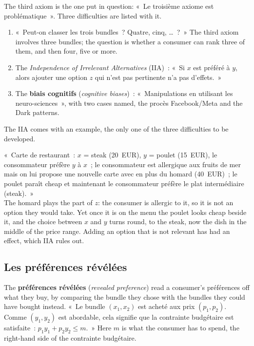 The third axiom is the one put in question: «~Le troisième axiome est
problématique~». Three difficulties are listed with it.

\begin{enumerate}
  \item «~Peut-on classer les trois bundles~? Quatre, cinq, \ldots~?~» The third
    axiom involves three bundles; the question is whether a consumer can rank
    three of them, and then four, five or more.
  \item The \emph{Independence of Irrelevant Alternatives} (IIA)~: «~Si $x$ est
    préféré à $y$, alors ajouter une option $z$ qui n'est pas pertinente n'a pas
    d'effets.~»
  \item The \textbf{biais cognitifs} (\textit{cognitive biases})~:
    «~Manipulations en utilisant les neuro-sciences~», with two cases named, the
    procès Facebook/Meta and the Dark patterns.
\end{enumerate}

The IIA comes with an example, the only one of the three difficulties to be
developed.

\begin{example}
  «~Carte de restaurant~: $x$ = steak (20~EUR), $y$ = poulet (15~EUR), le
  consommateur préfère $y$ à $x$~; le consommateur est allergique aux fruits de mer
  mais on lui propose une nouvelle carte avec en plus du homard (40~EUR)~; le
  poulet paraît cheap et maintenant le consommateur préfère le plat intermédiaire
  (steak).~»\\

  The homard plays the part of $z$: the consumer is allergic to it, so it is not an
  option they would take. Yet once it is on the menu the poulet looks cheap beside
  it, and the choice between $x$ and $y$ turns round, to the steak, now the dish in
  the middle of the price range. Adding an option that is not relevant has had an
  effect, which IIA rules out.
\end{example}

\subsection{Les préférences révélées}

The \textbf{préférences révélées} (\textit{revealed preference}) read a consumer's
préférences off what they buy, by comparing the bundle they chose with the bundles they
could have bought instead. «~Le bundle $(x_1, x_2)$ est acheté aux prix
$(p_1, p_2)$. Comme $(y_1, y_2)$ est abordable, cela signifie que la contrainte
budgétaire est satisfaite~: $p_1 y_1 + p_2 y_2 \le m$.~» Here $m$ is what the
consumer has to spend, the right-hand side of the contrainte budgétaire.\\

